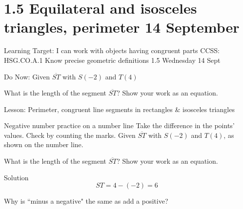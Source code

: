 \section{1.5 Equilateral and isosceles triangles, perimeter \hfill 14 September}
\begin{frame}{Learning Target: I can work with objects having congruent parts}
  {CCSS: HSG.CO.A.1 Know precise geometric definitions  \hfill \alert{1.5 Wednesday 14 Sept}}
    \begin{block}{Do Now: Given $\overline{ST}$ with $S(-2)$ and $T(4)$}
      \begin{center}
      \end{center}
    What is the length of the segment $\overline{ST}$? Show your work as an equation.
    \end{block} \vspace{2cm}
    Lesson: Perimeter, congruent line segments in rectangles \& isosceles triangles
  \end{frame}

\begin{frame}{Negative number practice on a number line}
  {Take the difference in the points' values. Check by counting the marks.}
  Given $\overline{ST}$ with $S(-2)$ and $T(4)$, as shown on the number line.
  \begin{center}
  \end{center}
  What is the length of the segment $\overline{ST}$? Show your work as an equation. \par \bigskip
  \qquad Solution 
  $$ST=4-(-2)=6$$
  \par \vspace{2cm}
  Why is ``minus a negative" the same as add a positive? 
  \end{frame}

